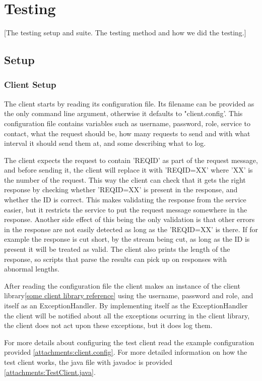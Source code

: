 \section{Testing}\label{Testing}
    [The testing setup and suite. The testing method and how we did the testing.]
    
    
    \subsection{Setup}\label{Testing:Setup}
        \subsubsection{Client Setup}\label{Testing:Setup:Client}
            The client starts by reading its configuration file. Its filename can be provided as the only command line argument, otherwise it defaults to "client.config'. This configuration file contains variables such as username, password, role, service to contact, what the request should be, how many requests to send and with what interval it should send them at, and some describing what to log.

            The client expects the request to contain '{REQID}' as part of the request message, and before sending it, the client will replace it with '{REQID=XX}' where 'XX' is the number of the request. This way the client can check that it gets the right response by checking whether '{REQID=XX}' is present in the response, and whether the ID is correct. This makes validating the response from the service easier, but it restricts the service to put the request message somewhere in the response. Another side effect of this being the only validation is that other errors in the response are not easily detected as long as the '{REQID=XX}' is there. If for example the response is cut short, by the stream being cut, as long as the ID is present it will be treated as valid. The client also prints the length of the response, so scripts that parse the results can pick up on responses with abnormal lengths.

            After reading the configuration file the client makes an instance of the client library\ref{some client library reference} using the username, password and role, and itself as an ExceptionHandler. By implementing itself as the ExceptionHandler the client will be notified about all the exceptions ocurring in the client library, the client does not act upon these exceptions, but it does log them. 

            For more details about configuring the test client read the example configuration provided \ref{attachments:client.config}. For more detailed information on how the test client works, the java file with javadoc is provided \ref{attachments:TestClient.java}.
